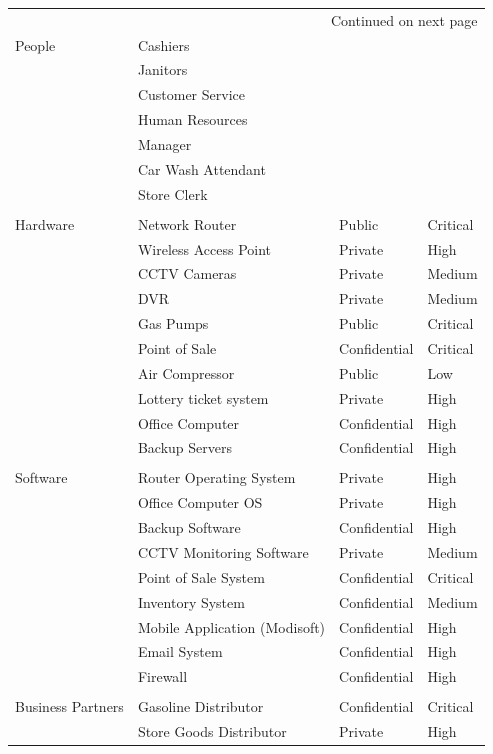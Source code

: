 \documentclass[11pt]{article}
\begin{document}
\begin{longtable}{llll}
\hline
\endhead
\hline\multicolumn{4}{r}{Continued on next page} \\
\endfoot
\endlastfoot
\hline
People & Cashiers &  & \\[0pt]
 & Janitors &  & \\[0pt]
 & Customer Service &  & \\[0pt]
 & Human Resources &  & \\[0pt]
 & Manager &  & \\[0pt]
 & Car Wash Attendant &  & \\[0pt]
 & Store Clerk &  & \\[0pt]
 &  &  & \\[0pt]
Hardware & Network Router & Public & Critical\\[0pt]
 & Wireless Access Point & Private & High\\[0pt]
 & CCTV Cameras & Private & Medium\\[0pt]
 & DVR & Private & Medium\\[0pt]
 & Gas Pumps & Public & Critical\\[0pt]
 & Point of Sale & Confidential & Critical\\[0pt]
 & Air Compressor & Public & Low\\[0pt]
 & Lottery ticket system & Private & High\\[0pt]
 & Office Computer & Confidential & High\\[0pt]
 & Backup Servers & Confidential & High\\[0pt]
 &  &  & \\[0pt]
Software & Router Operating System & Private & High\\[0pt]
 & Office Computer OS & Private & High\\[0pt]
 & Backup Software & Confidential & High\\[0pt]
 & CCTV Monitoring Software & Private & Medium\\[0pt]
 & Point of Sale System & Confidential & Critical\\[0pt]
 & Inventory System & Confidential & Medium\\[0pt]
 & Mobile Application (Modisoft) & Confidential & High\\[0pt]
 & Email System & Confidential & High\\[0pt]
 & Firewall & Confidential & High\\[0pt]
 &  &  & \\[0pt]
Business Partners & Gasoline Distributor & Confidential & Critical\\[0pt]
 & Store Goods Distributor & Private & High\\[0pt]

\end{longtable}
\end{document}
